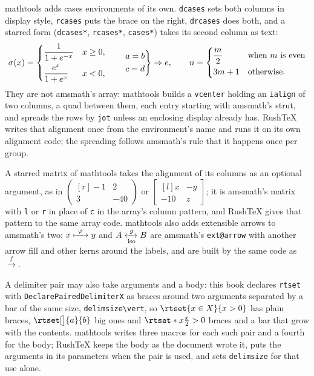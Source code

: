 \documentclass{article}
\numberwithin{equation}{section}
\theoremstyle{definition}
\theoremstyle{remark}
\begin{document}
mathtools adds cases environments of its own. \texttt{dcases} sets both columns in
display style, \texttt{rcases} puts the brace on the right, \texttt{drcases} does both,
and a starred form (\texttt{dcases*}, \texttt{rcases*}, \texttt{cases*}) takes its second
column as text:
\[
  \sigma(x) = \begin{dcases} \frac{1}{1+e^{-x}} & x \ge 0,\\ \frac{e^{x}}{1+e^{x}} & x < 0, \end{dcases}
  \qquad
  \begin{rcases} a = b \\ c = d \end{rcases} \Rightarrow e,
  \qquad
  n = \begin{dcases*} \frac{m}{2} & when $m$ is even\\ 3m+1 & otherwise. \end{dcases*}
\]
They are not amsmath's array: mathtools builds a \texttt{vcenter} holding an
\texttt{ialign} of two columns, a quad between them, each entry starting with amsmath's
strut, and spreads the rows by \texttt{jot} unless an enclosing display already has.
RushTeX writes that alignment once from the environment's name and runs it on its own
alignment code; the spreading follows amsmath's rule that it happens once per group.

A starred matrix of mathtools takes the alignment of its columns as an optional
argument, as in
$\begin{pmatrix*}[r] -1 & 2 \\ 3 & -40 \end{pmatrix*}$ or
$\begin{bmatrix*}[l] x & -y \\ -10 & z \end{bmatrix*}$; it is amsmath's matrix with
\texttt{l} or \texttt{r} in place of \texttt{c} in the array's column pattern, and RushTeX
gives that pattern to the same array code. mathtools also adds extensible arrows to
amsmath's two: $x \xmapsto{\ \varphi\ } y$ and $A \xleftrightarrow[\text{iso}]{g} B$ are
amsmath's \texttt{ext@arrow} with another arrow fill and other kerns around the labels,
and are built by the same code as $\xrightarrow{f}$.

A delimiter pair may also take arguments and a body: this book declares
\texttt{rtset} with \texttt{DeclarePairedDelimiterX} as braces around two arguments
separated by a bar of the same size, \texttt{delimsize\textbackslash vert}, so
$\rtset{x \in X}{x > 0}$ has plain braces, $\rtset[\big]{a}{b}$ big ones and
$\rtset*{x}{\frac{x}{2} > 0}$ braces and a bar that grow with the contents. mathtools
writes three macros for each such pair and a fourth for the body; RushTeX keeps the
body as the document wrote it, puts the arguments in its parameters when the pair is
used, and sets \texttt{delimsize} for that use alone.
\end{document}
